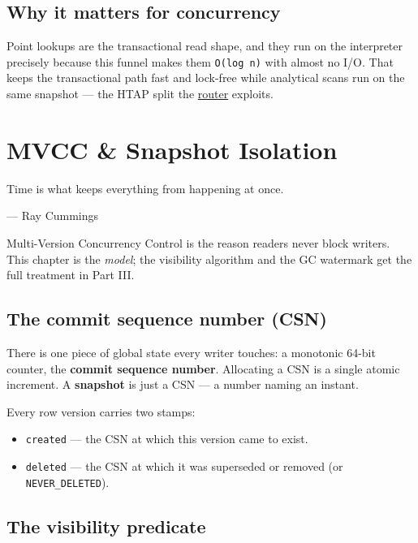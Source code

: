 \documentclass[
  11pt,
  openany]{book}
\providecommand{\tightlist}{%
  \setlength{\itemsep}{0pt}\setlength{\parskip}{0pt}}
\begin{document}
\section{Why it matters for
concurrency}\label{why-it-matters-for-concurrency}

Point lookups are the transactional read shape, and they run on the
interpreter precisely because this funnel makes them \texttt{O(log\ n)}
with almost no I/O. That keeps the transactional path fast and lock-free
while analytical scans run on the same snapshot --- the HTAP split the
\href{query-router.md}{router} exploits.

\chapter{MVCC \& Snapshot Isolation}\label{mvcc-snapshot-isolation}

\epigraph{Time is what keeps everything from happening at once.}{--- Ray Cummings}

Multi-Version Concurrency Control is the reason readers never block
writers. This chapter is the \emph{model}; the visibility algorithm and
the GC watermark get the full treatment in Part III.

\section{The commit sequence number
(CSN)}\label{the-commit-sequence-number-csn}

There is one piece of global state every writer touches: a monotonic
64-bit counter, the \textbf{commit sequence number}. Allocating a CSN is
a single atomic increment. A \textbf{snapshot} is just a CSN --- a
number naming an instant.

Every row version carries two stamps:

\begin{itemize}
\tightlist
\item
  \texttt{created} --- the CSN at which this version came to exist.
\item
  \texttt{deleted} --- the CSN at which it was superseded or removed (or
  \texttt{NEVER\_DELETED}).
\end{itemize}

\section{The visibility predicate}\label{the-visibility-predicate}
\end{document}

